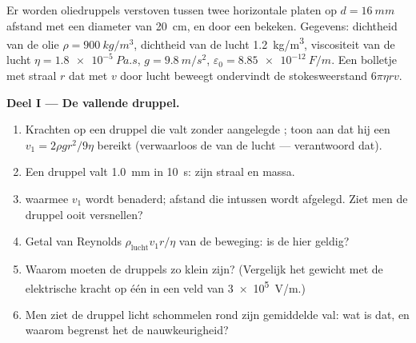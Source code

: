 \begin{problem}
\label{pb:b1:potential-capacitors:1}
Er worden oliedruppels verstoven tussen twee horizontale platen op $d = \qty{16}{mm}$
afstand met een diameter van \qty{20}{cm}, en door een  bekeken.
Gegevens: dichtheid van de olie $\rho = \qty{900}{kg/m^3}$, dichtheid van de lucht
\qty{1.2}{kg/m^3}, viscositeit van de lucht $\eta = \qty{1.8e-5}{Pa.s}$, $g =
\qty{9.8}{m/s^2}$, $\varepsilon_0 = \qty{8.85e-12}{F/m}$. Een bolletje met
straal $r$ dat met $v$ door lucht beweegt ondervindt de stokesweerstand $6\pi\eta rv$.

\medskip
\noindent\textbf{Deel I --- De vallende druppel.}
\begin{enumerate}
  \item Krachten op een druppel die valt zonder aangelegde ; toon aan dat hij
        een  $v_1 = 2\rho gr^2/9\eta$ bereikt (verwaarloos de
         van de lucht --- verantwoord dat).
  \item Een druppel valt \qty{1.0}{mm} in \qty{10}{s}: zijn straal en massa.
  \item {} waarmee $v_1$ wordt benaderd; afstand die intussen
        wordt afgelegd. Ziet men de druppel ooit versnellen?
  \item Getal van Reynolds $\rho_{\text{lucht}}v_1r/\eta$ van de beweging: is
        de  hier geldig?
  \item Waarom moeten de druppels zo klein zijn? (Vergelijk het gewicht met de
        elektrische kracht op één  in een veld van
        \qty{3e5}{V/m}.)
  \item Men ziet de druppel licht schommelen rond zijn gemiddelde val: wat
        is dat, en waarom begrenst het de nauwkeurigheid?
\end{enumerate}


\end{problem}
